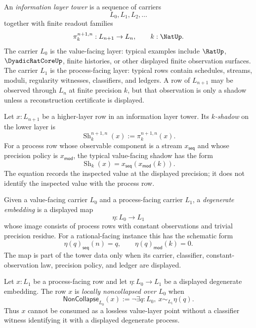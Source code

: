 \begin{definition}
\label{def:unified-reality-information-layer-tower}
An \emph{information layer tower} is a sequence of carriers
$$
L_0,L_1,L_2,\ldots
$$
together with finite readout families
$$
\pi^{n+1,n}_k:L_{n+1}\to L_n,
\qquad
k:\NatUp.
$$
The carrier $L_0$ is the value-facing layer: typical examples include
$\RatUp$, $\DyadicRatCoreUp$, finite histories, or other displayed
finite observation surfaces. The carrier $L_1$ is the process-facing
layer: typical rows contain schedules, streams, moduli, regularity
witnesses, classifiers, and ledgers. A row of $L_{n+1}$ may be observed
through $L_n$ at finite precision $k$, but that observation is only a
shadow unless a reconstruction certificate is displayed.
\end{definition}

\begin{definition}
\label{def:unified-reality-finite-shadow}
Let $x:L_{n+1}$ be a higher-layer row in an information layer tower. Its
\emph{$k$-shadow} on the lower layer is
$$
\operatorname{Sh}^{n+1,n}_k(x)
:=
\pi^{n+1,n}_k(x).
$$
For a process row whose observable component is a stream
$x_{\mathsf{seq}}$ and whose precision policy is $x_{\mathsf{mod}}$, the
typical value-facing shadow has the form
$$
\operatorname{Sh}_k(x)
=
x_{\mathsf{seq}}(x_{\mathsf{mod}}(k)).
$$
The equation records the inspected value at the displayed precision; it
does not identify the inspected value with the process row.
\end{definition}

\begin{definition}
\label{def:unified-reality-degenerate-embedding}
Given a value-facing carrier $L_0$ and a process-facing carrier $L_1$, a
\emph{degenerate embedding} is a displayed map
$$
\eta:L_0\to L_1
$$
whose image consists of process rows with constant observations and
trivial precision residue. For a rational-facing instance this has the
schematic form
$$
\eta(q)_{\mathsf{seq}}(n)=q,
\qquad
\eta(q)_{\mathsf{mod}}(k)=0.
$$
The map is part of the tower data only when its carrier, classifier,
constant-observation law, precision policy, and ledger are displayed.
\end{definition}

\begin{definition}
\label{def:unified-reality-local-noncollapse}
Let $x:L_1$ be a process-facing row and let
$\eta:L_0\to L_1$ be a displayed degenerate embedding. The row $x$ is
\emph{locally noncollapsed over $L_0$} when
$$
\mathsf{NonCollapse}_{L_0}(x)
:=
\neg\exists q:L_0,\ x\sim_{L_1}\eta(q).
$$
Thus $x$ cannot be consumed as a lossless value-layer point without a
classifier witness identifying it with a displayed degenerate process.
\end{definition}

